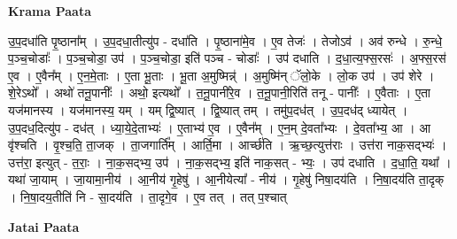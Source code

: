 \documentclass[17pt]{extarticle}
\begin{document}
\textbf{Krama Paata} \newline

उ॒प॒दधा॑ति पृ॒ष्ठाना᳚म् । उ॒प॒दधा॒तीत्यु॑प - दधा॑ति । पृ॒ष्ठाना॑मे॒व । ए॒व तेजः॑ । तेजोऽव॑ । अव॑ रुन्धे । रु॒न्धे॒ प॒ञ्च॒चोडाः᳚ । प॒ञ्च॒चोडा॒ उप॑ । प॒ञ्च॒चोडा॒ इति॑ पञ्च - चोडाः᳚ । उप॑ दधाति । द॒धा॒त्य॒फ्स॒रसः॑ । अ॒फ्स॒रस॑ ए॒व । ए॒वैन᳚म् । ए॒न॒मे॒ताः । ए॒ता भू॒ताः । भू॒ता अ॒मुष्मिन्न्॑ । अ॒मुष्मि॑न् ॅलो॒के । लो॒क उप॑ । उप॑ शेरे । शे॒रेऽथो᳚ । अथो॑ तनू॒पानीः᳚ । अथो॒ इत्यथो᳚ । त॒नू॒पानी॑रे॒व । त॒नू॒पानी॒रिति॑ तनू - पानीः᳚ । ए॒वैताः । ए॒ता यज॑मानस्य । यज॑मानस्य॒ यम् । यम् द्वि॒ष्यात् । द्वि॒ष्यात् तम् । तमु॑प॒दध॑त् । उ॒प॒दध॑द् ध्यायेत् । उ॒प॒दध॒दित्यु॑प - दध॑त् । ध्या॒ये॒दे॒ताभ्यः॑ । ए॒ताभ्य॑ ए॒व । ए॒वैन᳚म् । ए॒न॒म् दे॒वता᳚भ्यः । दे॒वता᳚भ्य॒ आ । आ वृ॑श्चति । वृ॒श्च॒ति॒ ता॒जक् । ता॒जगार्ति᳚म् । आर्ति॒मा । आर्च्छ॑ति । ऋ॒च्छ॒त्युत्त॑राः । उत्त॑रा नाक॒सद्भ्यः॑ । उत्त॑रा॒ इत्युत् - त॒राः॒ । ना॒क॒सद्भ्य॒ उप॑ । ना॒क॒सद्भ्य॒ इति॑ नाक॒सत् - भ्यः॒ । उप॑ दधाति । द॒धा॒ति॒ यथा᳚ । यथा॑ जा॒याम् । जा॒यामा॒नीय॑ । आ॒नीय॑ गृ॒हेषु॑ । आ॒नीयेत्या᳚ - नीय॑ । गृ॒हेषु॑ निषा॒दय॑ति । नि॒षा॒दय॑ति ता॒दृक् । नि॒षा॒दय॒तीति॑ नि - सा॒दय॑ति । ता॒दृगे॒व । ए॒व तत् । तत् प॒श्चात् \newline

\textbf{Jatai Paata} \newline
\end{document}
